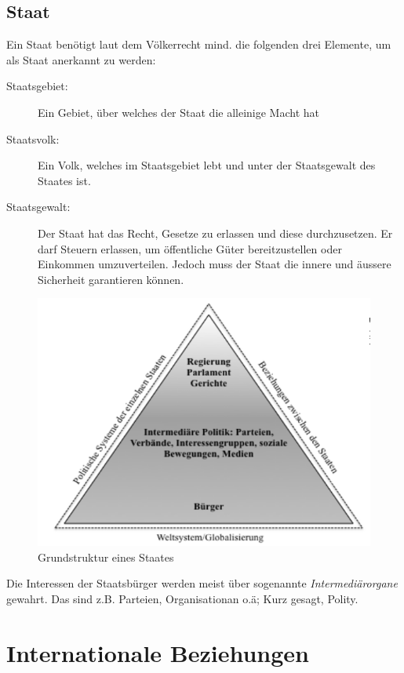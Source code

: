 \documentclass[a4paper, 11pt]{article}
\begin{document}
\subsection{Staat}
Ein Staat benötigt laut dem Völkerrecht mind. die folgenden drei Elemente, um als Staat anerkannt zu werden: 
\begin{description}
    \item[Staatsgebiet: ] Ein Gebiet, über welches der Staat die alleinige Macht hat
    \item[Staatsvolk: ] Ein Volk, welches im Staatsgebiet lebt und unter der Staatsgewalt des Staates ist.
    \item[Staatsgewalt: ] Der Staat hat das Recht, Gesetze zu erlassen und diese durchzusetzen. Er darf Steuern erlassen, um öffentliche Güter bereitzustellen oder Einkommen umzuverteilen. Jedoch muss der Staat die innere und äussere Sicherheit garantieren können.
\end{description}

\begin{figure}[htb]
    \centering
    \includegraphics[keepaspectratio=true,height=15\baselineskip]{analytische_grundstruktur.png}
    \caption{Grundstruktur eines Staates}
    \label{fig:grundstrk_staat}
\end{figure}

Die Interessen der Staatsbürger werden meist über sogenannte \textit{Intermediärorgane} gewahrt. Das sind z.B. Parteien, Organisationan o.ä; Kurz gesagt, Polity.

	\section{Internationale Beziehungen}
\end{document}
